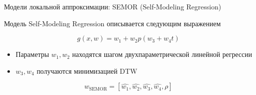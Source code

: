 \documentclass{beamer}
\DeclareMathOperator*{\argmin}{arg\,min}
\begin{document}
\begin{frame}{Модели локальной аппроксимации: SEMOR (Self-Modeling Regression)}

Модель Self-Modeling Regression описывается следующим выражением

$$
g(x, w) = w_1 + w_2 p(w_3 + w_4t)
$$

\begin{itemize}
    \item Параметры $w_1, w_2$ находятся шагом двухпараметрической
линейной регрессии
    \item $w_3, w_4$ получаются минимизацией DTW
\end{itemize}

$$
w_{\text{SEMOR}} = [\hat{w_1}, \hat{w_2}, \hat{w_3}, \hat{w_4}, \rho]
$$

\end{frame}



\end{document}
